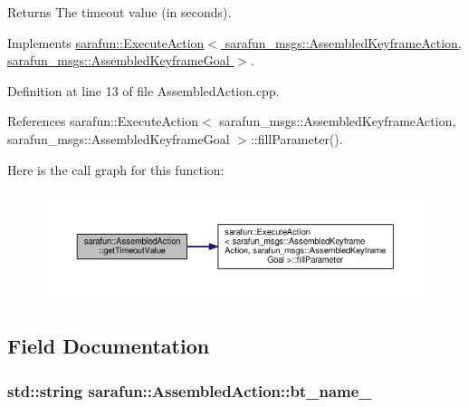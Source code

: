 \begin{DoxyReturn}{Returns}
The timeout value (in seconds). 
\end{DoxyReturn}


Implements \hyperlink{classsarafun_1_1ExecuteAction_aba6cfa8a8ce19e735eb6394424df6d17_aba6cfa8a8ce19e735eb6394424df6d17}{sarafun\-::\-Execute\-Action$<$ sarafun\-\_\-msgs\-::\-Assembled\-Keyframe\-Action, sarafun\-\_\-msgs\-::\-Assembled\-Keyframe\-Goal $>$}.



Definition at line 13 of file Assembled\-Action.\-cpp.



References sarafun\-::\-Execute\-Action$<$ sarafun\-\_\-msgs\-::\-Assembled\-Keyframe\-Action, sarafun\-\_\-msgs\-::\-Assembled\-Keyframe\-Goal $>$\-::fill\-Parameter().



Here is the call graph for this function\-:\nopagebreak
\begin{figure}[H]
\begin{center}
\leavevmode
\includegraphics[width=350pt]{dc/d58/classsarafun_1_1AssembledAction_ade9095a291dce652339238d137419b49_ade9095a291dce652339238d137419b49_cgraph}
\end{center}
\end{figure}




\subsection{Field Documentation}
\hypertarget{classsarafun_1_1AssembledAction_a4dae92c3c98d924c35f9cda69ede136d_a4dae92c3c98d924c35f9cda69ede136d}{
\subsubsection[{bt\-\_\-name\-\_\-}]{\setlength{\rightskip}{0pt plus 5cm}std\-::string sarafun\-::\-Assembled\-Action\-::bt\-\_\-name\-\_\-\hspace{0.3cm}{\ttfamily [private]}}}\label{classsarafun_1_1AssembledAction_a4dae92c3c98d924c35f9cda69ede136d_a4dae92c3c98d924c35f9cda69ede136d}


